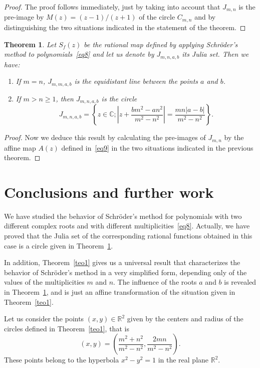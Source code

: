 \documentclass[10pt,a4paper]{article}
\newtheorem{Theorem}{Theorem}
\begin{document}
\begin{proof}%
The proof follows immediately, just by taking into account that $J_{m,n}$ is the pre-image by $M(z)=(z-1)/(z+1)$ of the circle $C_{m,n}$ and by distinguishing the two situations indicated in the statement of the theorem.
\end{proof}

\begin{Theorem}\label{teo2}
Let $S_f(z)$ be the rational map defined by applying Schr\"oder's method to polynomials~\eqref{eq8} and let us denote by  $J_{m,n,a,b}$ its Julia set. Then we have:
\begin{enumerate}
\item   If $m=n$,  $J_{m,m,a,b}$ is the equidistant line between the points $a$ and $b$.
\item   If $m>n\ge 1$, then $J_{m,n,a,b}$  is the circle
$$J_{m,n,a,b}=\left\{z\in\mathbb{C}; \left|z+\frac{b m^2-a n^2}{m^2-n^2}\right|=\frac{mn |a-b|}{m^2-n^2}\right\}.$$
\end{enumerate}
\end{Theorem}

\begin{proof}%
Now we deduce this result  by calculating the pre-images of $J_{m,n}$ by the affine map $A(z)$ defined in~\eqref{eq9}  in the two situations indicated in the previous theorem.
\end{proof}



\section{Conclusions and further work}


We have studied the behavior of Schr\"oder's method for polynomials with two different complex roots and with different multiplicities~\ref{eq8}. Actually, we have proved that the Julia set of the corresponding rational functions obtained in this case is a circle given in Theorem~\ref{teo2}.

In addition, Theorem~\ref{teo1} gives us a universal result that characterizes the behavior of Schr\"oder's method in a very simplified form, depending only of the values of the multiplicities $m$ and $n$. The influence of the roots $a$ and $b$ is revealed in Theorem~\ref{teo2}, and is just an affine transformation of the situation given in Theorem~\ref{teo1}.


Let us consider the points $(x,y)\in\mathbb{R}^2$ given by the centers and radius of the circles defined in Theorem~\ref{teo1}, that is
$$
(x,y)=\left( \frac{m^2+n^2}{m^2-n^2}, \frac{2mn}{m^2-n^2}\right).
$$
These points belong to the hyperbola $x^2-y^2=1$ in the real plane $\mathbb{R}^2$.
\end{document}
